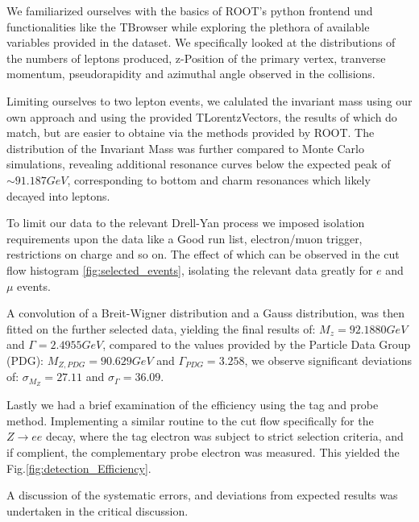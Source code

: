 \documentclass[11 pt]{article}
\begin{document}
We familiarized ourselves with the basics of ROOT's python frontend und functionalities like the TBrowser while exploring the plethora of available variables provided in the dataset.
We specifically looked at the distributions of the numbers of leptons produced, z-Position of the primary vertex, tranverse momentum, pseudorapidity and azimuthal angle observed in the collisions.

Limiting ourselves to two lepton events, we calulated the invariant mass using our own approach and using the provided TLorentzVectors, the results of which do match, but are easier to obtaine via the methods provided by ROOT.
The distribution of the Invariant Mass was further compared to Monte Carlo simulations, revealing additional resonance curves below the expected peak of $\sim 91.187GeV$, corresponding to bottom and charm resonances which likely decayed into leptons. 

To limit our data to the relevant Drell-Yan process we imposed isolation requirements upon the data like a Good run list, electron/muon trigger, restrictions on charge and so on. The effect of which can be observed in the cut flow histogram \ref{fig:selected_events}, isolating the relevant data greatly for $e$ and $\mu$ events. 

A convolution of a Breit-Wigner distribution and a Gauss distribution, was then fitted on the further selected data, yielding the final results of: $M_{z} = 92.1880 GeV$ and $\Gamma = 2.4955 GeV$, compared to the values provided by the Particle Data Group (PDG): $M_{Z,PDG} = 90.629 GeV$ and $\Gamma_{PDG} = 3.258$, we observe significant deviations of: $\sigma_{M_Z} = 27.11$ and $\sigma_{\Gamma}=36.09$.

 Lastly we had a brief examination of the efficiency using the tag and probe method. Implementing a similar routine to the cut flow specifically for the $Z \rightarrow e e$ decay, where the tag electron was subject to strict selection criteria, and if complient, the complementary probe electron was measured. This yielded the Fig.\ref*{fig:detection_Efficiency}.
 
 A discussion of the systematic errors, and deviations from expected results was undertaken in the critical discussion.
 
 

 
\end{document}
